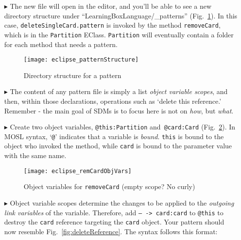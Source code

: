 \begin{itemize}
\newpage

\item[$\blacktriangleright$] The new file will open in the editor, and you'll be able to see a new directory structure under ``LearningBoxLanguage/\_patterns''
(Fig.~\ref{fig:pattStruct}). In this case, \texttt{deleteSingleCard.pattern} is invoked by the method \texttt{removeCard}, which is in the \texttt{Partition}
EClass. \texttt{Partition} will eventually contain a folder for each method that needs a pattern.

\vspace{0.5cm}

\begin{figure}[htp]
\begin{center}
  \texttt{[image: eclipse\_patternStructure]}
  \caption{Directory structure for a pattern}
  \label{fig:pattStruct}
\end{center}
\end{figure}

\item[$\blacktriangleright$] The content of any pattern file is simply a list \emph{object variable scopes}, and then,
within those declarations, operations such as `delete this reference.' Remember - the main goal of SDMs is to focus here is not on \emph{how}, but
\emph{what}.

\vspace{0.5cm}

\item[$\blacktriangleright$] Create two object variables, \texttt{@this:Partition} and~\texttt{@card:Card} (Fig.~\ref{fig:remCardObjVar}). In MOSL syntax,
`\texttt{@}' indicates that a variable is \emph{bound}. \texttt{this} is bound to the object who invoked the method, while \texttt{card} is bound to the
parameter value with the same name.

\begin{figure}[htp]
\begin{center}
  \texttt{[image: eclipse\_remCardObjVars]}
  \caption{Object variables for \texttt{removeCard} \update (empty scope? No curly)}
  \label{fig:remCardObjVar}
\end{center}
\end{figure}

\clearpage

\item[$\blacktriangleright$] Object variable scopes determine the changes to be applied to the \emph{outgoing link variables} of the variable. Therefore, add
\texttt{-- -> card:card} to \texttt{@this} to destroy the \texttt{card} reference targeting the \texttt{card} object. Your pattern should now resemble
Fig.~\ref{fig:deleteReference}. The syntax follows this format:


\end{itemize}
